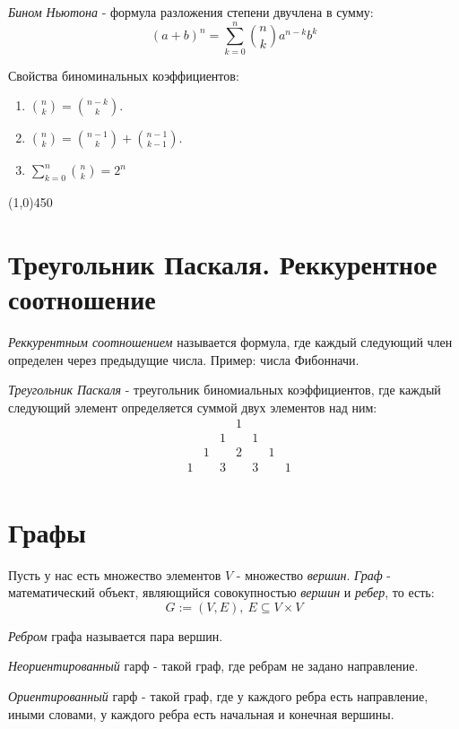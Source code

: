 \documentclass[a4paper,12pt]{article}
\begin{document}
	\textit{Бином Ньютона} - формула разложения степени двучлена в сумму:
	\[
	(a + b)^n = \sum_{k = 0}^{n} {n \choose k} a^{n - k}b^k
	\]
	
	Свойства биноминальных коэффициентов:
	\begin{enumerate}
		\item ${n \choose k} = {n - k \choose k}$.
		\item ${n \choose k} = {n - 1 \choose k} + {n -1 \choose k - 1}.$
		\item $\sum_{k = 0}^n {n \choose k} = 2 ^ n$
	\end{enumerate}
	
	
	\begin{center}
		\line(1,0){450}
	\end{center}
	
	\section*{Треугольник Паскаля. Реккурентное соотношение}
	\textit{Реккурентным соотношением} называется формула, где каждый следующий член определен через предыдущие числа. Пример: числа Фибонначи. 
	
	\textit{Треугольник Паскаля} - треугольник биномиальных коэффициентов, где каждый следующий элемент определяется суммой двух элементов над ним:
	\[
	\begin{matrix}
			&	&	&	&1	&	&	&	\\
			&	&	&1	&	& 1 & 	&	\\
			&	&1	&	&2	&	&1 	& 	\\	
			&1	&	&3	&	&3	& 	&1 	\\	
			
	\end{matrix}	
	\]
	
	\section*{Графы}
	Пусть у нас есть множество элементов $V$ - множество \textit{вершин}. 
	\textit{Граф} - математический объект, являющийся совокупностью \textit{вершин} и \textit{ребер}, то есть:
	\[
	G := (V, E), \ E \subseteq V \times V
	\]
	
	\textit{Ребром} графа называется пара вершин.
	
	\textit{Неориентированный} гарф - такой граф, где ребрам не задано направление.
	
	\textit{Ориентированный} гарф - такой граф, где у каждого ребра есть направление, иными словами, у каждого ребра есть начальная и конечная вершины.
	
\end{document}
